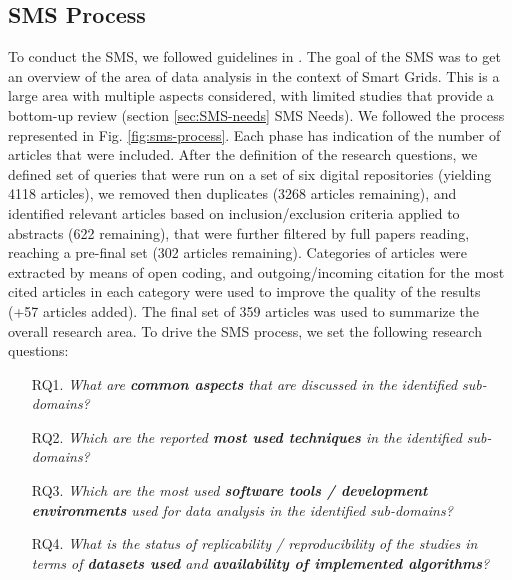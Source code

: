 \documentclass[journal]{IEEEtran}
\begin{document}
\subsection{SMS Process}
To conduct the SMS, we followed guidelines in \cite{ref:petersen2008systematic,ref:barn2017conductingsms}.
The goal of the SMS was to get an overview of the area of data analysis in the context of Smart Grids. This is a large  area with multiple aspects considered, with limited studies that provide a bottom-up review (section \ref{sec:SMS-needs} SMS Needs). We followed the process represented in Fig. \ref{fig:sms-process}. Each phase has indication of the number of articles that were included. After the definition of the research questions, we defined set of queries that were run on a set of six digital repositories (yielding 4118 articles), we removed then duplicates (3268 articles remaining), and identified relevant articles based on inclusion/exclusion criteria applied to abstracts (622 remaining), that were further filtered by full papers reading, reaching a pre-final set (302 articles remaining). Categories of articles were extracted by means of open coding, and outgoing/incoming citation for the most cited articles in each category were used to improve the quality of the results (+57 articles added). The final set of 359 articles was used to summarize the overall research area. To drive the SMS process, we set the following research questions:

\begin{enumerate}
\item[{RQ}1.] \textit{What are \textbf{common aspects} that are discussed in the identified sub-domains?}
\item[{RQ}2.] \textit{Which are the reported \textbf{most used techniques} in the identified sub-domains?}
\item[{RQ}3.] \textit{Which are the most used \textbf{software tools / development environments} used for data analysis in the identified sub-domains?}
\item[{RQ}4.] \textit{What is the status of replicability / reproducibility of the studies in terms of \textbf{datasets used} and \textbf{availability of implemented algorithms}?}
\end{enumerate}
\end{document}
